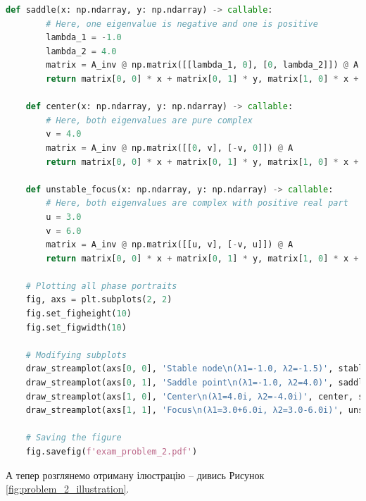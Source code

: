 \documentclass[oneside,solution]{tmpl}
\begin{document}
\begin{lstlisting}[language=Python]
    def saddle(x: np.ndarray, y: np.ndarray) -> callable:
        # Here, one eigenvalue is negative and one is positive
        lambda_1 = -1.0
        lambda_2 = 4.0
        matrix = A_inv @ np.matrix([[lambda_1, 0], [0, lambda_2]]) @ A
        return matrix[0, 0] * x + matrix[0, 1] * y, matrix[1, 0] * x + matrix[1, 1] * y
    
    def center(x: np.ndarray, y: np.ndarray) -> callable:
        # Here, both eigenvalues are pure complex
        v = 4.0
        matrix = A_inv @ np.matrix([[0, v], [-v, 0]]) @ A
        return matrix[0, 0] * x + matrix[0, 1] * y, matrix[1, 0] * x + matrix[1, 1] * y
    
    def unstable_focus(x: np.ndarray, y: np.ndarray) -> callable:
        # Here, both eigenvalues are complex with positive real part
        u = 3.0
        v = 6.0
        matrix = A_inv @ np.matrix([[u, v], [-v, u]]) @ A
        return matrix[0, 0] * x + matrix[0, 1] * y, matrix[1, 0] * x + matrix[1, 1] * y
    
    # Plotting all phase portraits
    fig, axs = plt.subplots(2, 2)
    fig.set_figheight(10)
    fig.set_figwidth(10)
    
    # Modifying subplots
    draw_streamplot(axs[0, 0], 'Stable node\n(λ1=-1.0, λ2=-1.5)', stable_node, stationary_points=[(0.0, 0.0)])
    draw_streamplot(axs[0, 1], 'Saddle point\n(λ1=-1.0, λ2=4.0)', saddle, stationary_points=[(0.0, 0.0)])
    draw_streamplot(axs[1, 0], 'Center\n(λ1=4.0i, λ2=-4.0i)', center, stationary_points=[(0.0, 0.0)])
    draw_streamplot(axs[1, 1], 'Focus\n(λ1=3.0+6.0i, λ2=3.0-6.0i)', unstable_focus, stationary_points=[(0.0, 0.0)])
    
    # Saving the figure
    fig.savefig(f'exam_problem_2.pdf')
\end{lstlisting}

А тепер розглянемо отриману ілюстрацію -- дивись Рисунок \ref{fig:problem_2_illustration}.
\end{document}
